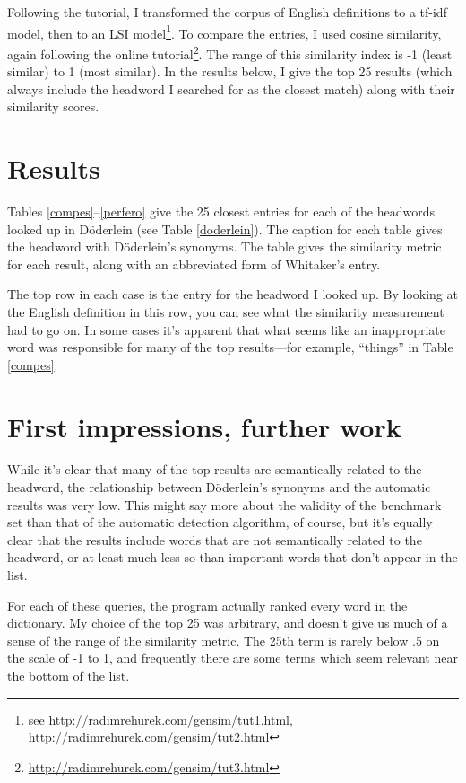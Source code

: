 \documentclass[]{article}
\begin{document}
		Following the tutorial, I transformed the corpus of English definitions to a tf-idf model, then to an LSI model\footnote{see \url{http://radimrehurek.com/gensim/tut1.html}, \url{http://radimrehurek.com/gensim/tut2.html}}.  To compare the entries, I used cosine similarity, again following the online tutorial\footnote{\url{http://radimrehurek.com/gensim/tut3.html}}.  The range of this similarity index is -1 (least similar) to 1 (most similar).  In the results below, I give the top 25 results (which always include the headword I searched for as the closest match) along with their similarity scores.
		
	\section{Results}

	Tables \ref{compes}–\ref{perfero} give the 25 closest entries for each of the headwords looked up in Döderlein (see Table \ref{doderlein}).  The caption for each table gives the headword with Döderlein's synonyms.  The table gives the similarity metric for each result, along with an abbreviated form of Whitaker's entry.  
	
	The top row in each case is the entry for the headword I looked up.  By looking at the English definition in this row, you can see what the similarity measurement had to go on.  In some cases it's apparent that what seems like an inappropriate word was responsible for many of the top results—for example, “things” in Table \ref{compes}.
	
	\section{First impressions, further work}
	
	While it's clear that many of the top results are semantically related to the headword, the relationship between Döderlein's synonyms and the automatic results was very low.  This might say more about the validity of the benchmark set than that of the automatic detection algorithm, of course, but it's equally clear that the results include words that are not semantically related to the headword, or at least much less so than important words that don't appear in the list.
	
	For each of these queries, the program actually ranked every word in the dictionary.  My choice of the top 25 was arbitrary, and doesn't give us much of a sense of the range of the similarity metric.  The 25th term is rarely below .5 on the scale of -1 to 1, and frequently there are some terms which seem relevant near the bottom of the list.
	
\end{document}
